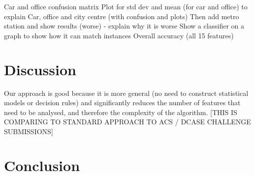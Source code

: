 \documentclass[11pt]{article}
\begin{document}
\begin{multicols}{2}
Car and office confusion matrix
Plot for std dev and mean (for car and office) to explain
Car, office and city centre (with confusion and plots)
Then add metro station and show results (worse) - explain why it is worse
Show a classifier on a graph to show how it can match instances
Overall accuracy (all 15 features)


\section{Discussion}


Our approach is good because it is more general (no need to construct statistical models or decision rules) and significantly reduces the number of features that need to be analysed, and therefore the complexity of the algorithm. [THIS IS COMPARING TO STANDARD APPROACH TO ACS / DCASE CHALLENGE SUBMISSIONS]






\section{Conclusion}







\end{multicols}
\end{document}
